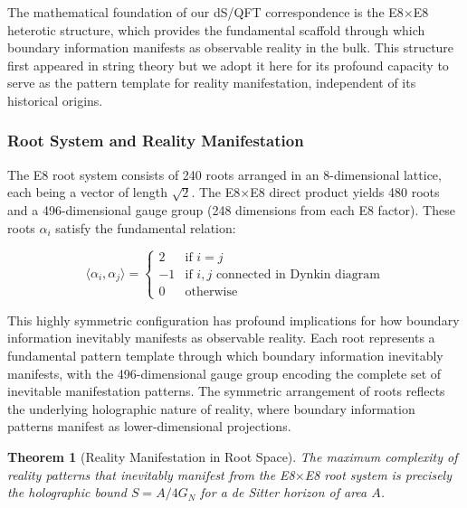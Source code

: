 \documentclass[11pt,english,twoside]{article}
\theoremstyle{plain}
\newtheorem{theorem}{Theorem}[section]
\theoremstyle{definition}
\theoremstyle{remark}
\begin{document}
The mathematical foundation of our dS/QFT correspondence is the E8$\times$E8 heterotic structure, which provides the fundamental scaffold through which boundary information manifests as observable reality in the bulk. This structure first appeared in string theory \cite{Gross1985,Harvey1986} but we adopt it here for its profound capacity to serve as the pattern template for reality manifestation, independent of its historical origins.

\subsubsection{Root System and Reality Manifestation}

The E8 root system consists of 240 roots arranged in an 8-dimensional lattice, each being a vector of length $\sqrt{2}$. The E8$\times$E8 direct product yields 480 roots and a 496-dimensional gauge group (248 dimensions from each E8 factor). These roots $\alpha_i$ satisfy the fundamental relation:

\begin{equation}
\label{eq:root_system}
\langle \alpha_i, \alpha_j \rangle = \begin{cases}
2 & \text{if } i = j \\
-1 & \text{if } i,j \text{ connected in Dynkin diagram} \\
0 & \text{otherwise}
\end{cases}
\end{equation}

This highly symmetric configuration has profound implications for how boundary information inevitably manifests as observable reality. Each root represents a fundamental pattern template through which boundary information inevitably manifests, with the 496-dimensional gauge group encoding the complete set of inevitable manifestation patterns. The symmetric arrangement of roots reflects the underlying holographic nature of reality, where boundary information patterns manifest as lower-dimensional projections.

\begin{theorem}[Reality Manifestation in Root Space]
\label{thm:root_encoding}
The maximum complexity of reality patterns that inevitably manifest from the E8$\times$E8 root system is precisely the holographic bound $S = A/4G_N$ for a de Sitter horizon of area $A$.
\end{theorem}
\end{document}

